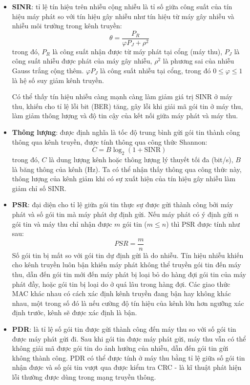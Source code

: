 \documentclass{uetgraduation}
\begin{document}
\begin{itemize}
    \item \textbf{SINR}: tỉ lệ tín hiệu trên nhiễu cộng nhiễu là tỉ số giữa công suất của tín hiệu máy phát so với tín hiệu gây nhiễu như
    tín hiệu từ máy gây nhiễu và nhiễu môi trường trong kênh truyền:
    \begin{equation}
        \theta = \frac{P_R}{\varphi P_J + \rho^2}
        \label{eq:sinr}
    \end{equation}
    trong đó, $P_R$ là công suất nhận được từ máy phát tại cổng (máy thu), $P_J$ là công suất nhiễu được phát của máy gây nhiễu, $\rho^2$ là phương sai
    của nhiễu Gauss trắng cộng thêm. $\varphi P_J$ là công suất nhiễu tại cổng, trong đó $0 \leq \varphi \leq 1$ là hệ số suy giảm kênh truyền.

    Có thể thấy tín hiệu nhiễu càng mạnh càng làm giảm giá trị SINR ở máy thu, khiến cho tỉ lệ lỗi bit (BER) tăng, gây lỗi khi giải mã gói tin ở máy thu,
    làm giảm thông lượng và độ tin cậy của kết nối giữa máy phát và máy thu.
    \item \textbf{Thông lượng}: được định nghĩa là tốc độ trung bình gửi gói tin thành công thông qua kênh truyền, được tính thông qua công thức Shannon:
    \begin{equation}
        C = B \log_2(1 + \text{SINR})
        \label{eq:shannon}
    \end{equation}
    trong đó, $C$ là dung lượng kênh hoặc thông lượng lý thuyết tối đa (bit/s), $B$ là băng thông của kênh (Hz). Ta có thể nhận thấy thông qua công thức này,
    thông lượng của kênh giảm khi có sự xuất hiện của tín hiệu gây nhiễu làm giảm chỉ số SINR.
    \item \textbf{PSR}: đại diện cho tỉ lệ giữa gói tin thực sự được gửi thành công bởi máy phát và số gói tin mà máy phát dự định gửi. Nếu máy phát có ý
    định gửi $n$ gói tin và máy thu chỉ nhận được $m$ gói tin ($m \leq n$) thì PSR được tính như sau:
    \begin{equation}
        PSR = \frac{m}{n}
        \label{eq:psr}
    \end{equation}
    Số gói tin bị mất so với gói tin dự định gửi là do nhiễu. Tín hiệu nhiễu khiến cho kênh truyền luôn bận khiến máy phát không thể truyền gói tin đến máy
    thu, dẫn đến gói tin mới đến máy phát bị loại bỏ do hàng đợi gói tin của máy phát đầy, hoặc gói tin bị loại do ở quá lâu trong hàng đợi. Các giao thức
    MAC khác nhau có cách xác định kênh truyền đang bận hay không khác nhau, một trong số đó là nếu cường độ tín hiệu của kênh lớn hơn ngưỡng xác định trước,
    kênh sẽ được xác định là bận.
    \item \textbf{PDR}: là tỉ lệ số gói tin được gửi thành công đến máy thu so với số gói tin được máy phát gửi đi. Sau khi gói tin được máy phát gửi, máy thu
    vẫn có thể không giải mã được gói tin do ảnh hưởng của nhiễu, dẫn đến gói tin gửi không thành công. PDR có thể được tính ở máy thu bằng tỉ lệ giữa số gói
    tin nhận được và số gói tin vượt qua được kiểm tra CRC - là kĩ thuật phát hiện lỗi thường được dùng trong mạng truyền thông.
    

\end{itemize}
\end{document}
